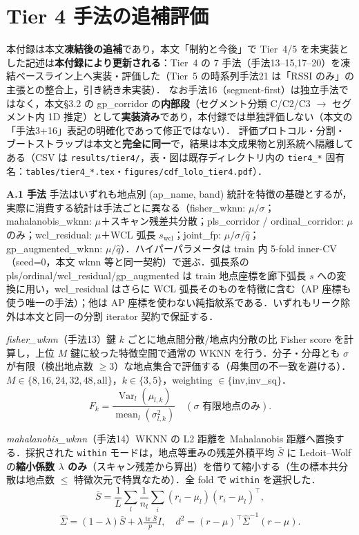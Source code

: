 \documentclass[a4paper,twocolumn]{ltjsarticle}
\begin{document}
\section{Tier 4 手法の追補評価}

本付録は本文\textbf{凍結後の追補}であり，本文「制約と今後」で Tier~4/5 を未実装とした記述は\textbf{本付録により更新される}：Tier~4 の 7 手法（手法13--15,17--20）を凍結ベースライン上へ実装・評価した（Tier~5 の時系列手法21 は「RSSI のみ」の主張との整合上，引き続き未実装）．
なお手法16（segment-first）は独立手法ではなく，本文§3.2 の gp\_corridor の\textbf{内部段}（セグメント分類 C/C2/C3 $\to$ セグメント内 1D 推定）として\textbf{実装済み}であり，本付録では単独評価しない（本文の「手法3+16」表記の明確化であって修正ではない）．
評価プロトコル・分割・ブートストラップは本文と\textbf{完全に同一}で，結果は本文成果物と別系統へ隔離してある（CSV は \texttt{results/tier4/}，表・図は既存ディレクトリ内の \texttt{tier4\_*} 固有名：\texttt{tables/tier4\_*.tex}・\texttt{figures/cdf\_lolo\_tier4.pdf}）．

\smallskip\noindent\textbf{A.1\; 手法} 手法はいずれも地点別 (ap\_name, band) 統計を特徴の基礎とするが，実際に消費する統計は手法ごとに異なる（fisher\_wknn: $\mu/\sigma$；mahalanobis\_wknn: $\mu$＋スキャン残差共分散；pls\_corridor / ordinal\_corridor: $\mu$ のみ；wcl\_residual: $\mu$＋WCL 弧長 $s_{\mathrm{wcl}}$；joint\_fp: $\mu/\sigma/\hat q$；gp\_augmented\_wknn: $\mu/\hat q$）．ハイパーパラメータは train 内 5-fold inner-CV（seed=0，本文 wknn 等と同一契約）で選ぶ．弧長系の pls/ordinal/wcl\_residual/gp\_augmented は train 地点座標を廊下弧長 $s$ への変換に用い，wcl\_residual はさらに WCL 弧長そのものを特徴に含む（AP 座標も使う唯一の手法）；他は AP 座標を使わない純指紋系である．いずれもリーク除外は本文と同一の分割 iterator 契約で保証する．

\smallskip\noindent\textit{fisher\_wknn}（手法13）\;鍵 $k$ ごとに地点間分散/地点内分散の比 Fisher score を計算し，上位 $M$ 鍵に絞った特徴空間で通常の WKNN を行う．分子・分母とも $\sigma$ が有限（検出地点数 $\geq 3$）な地点集合で評価する（母集団の不一致を避ける）．$M\in\{8,16,24,32,48,\text{all}\}$，$k\in\{3,5\}$，weighting $\in\{$inv,inv\_sq$\}$．
\[
  F_k=\frac{\operatorname{Var}_l(\mu_{l,k})}{\operatorname{mean}_l(\sigma_{l,k}^2)}\quad(\sigma\text{ 有限地点のみ}).
\]

\smallskip\noindent\textit{mahalanobis\_wknn}（手法14）\;WKNN の L2 距離を Mahalanobis 距離へ置換する．採択された \texttt{within} モードは，地点等重みの残差外積平均 $\bar S$ に Ledoit--Wolf の\textbf{縮小係数 $\lambda$ のみ}（スキャン残差から算出）を借りて縮小する（生の標本共分散は地点数 $\leq$ 特徴次元で特異なため）．全 fold で \texttt{within} を選択した．
\[
  \bar S=\frac1L\sum_{l}\frac1{n_l}\sum_i(r_i-\mu_l)(r_i-\mu_l)^\top,
\]
\[
  \hat\Sigma=(1-\lambda)\bar S+\lambda\tfrac{\operatorname{tr}\bar S}{p}I,\quad
  d^2=(r-\mu)^\top\hat\Sigma^{-1}(r-\mu).
\]
\end{document}
